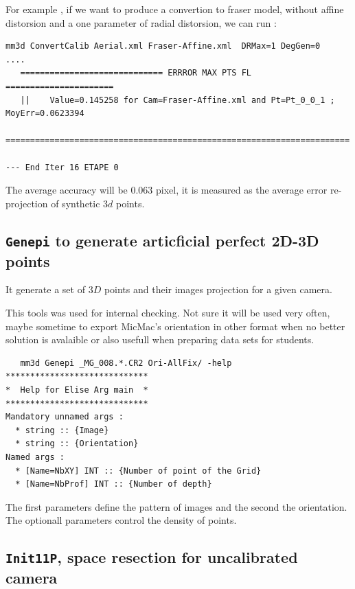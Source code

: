 For example , if we want to produce a convertion to fraser model, without affine distorsion and a one parameter of radial
distorsion, we can run :

\begin{verbatim}
mm3d ConvertCalib Aerial.xml Fraser-Affine.xml  DRMax=1 DegGen=0
....
   ============================= ERRROR MAX PTS FL ======================
   ||    Value=0.145258 for Cam=Fraser-Affine.xml and Pt=Pt_0_0_1 ; MoyErr=0.0623394
   ======================================================================

--- End Iter 16 ETAPE 0

\end{verbatim}


The average accuracy will be $0.063$ pixel, it is measured as the average error re-projection of  synthetic $3d$ points.



\subsection{{\tt Genepi} to generate articficial perfect 2D-3D points}

It generate a set of $3D$ points and their images projection for a given camera.

This tools was used for internal checking. Not sure it will be used very often, maybe sometime to export 
MicMac's orientation in other format when no better solution is avalaible or also usefull when preparing
data sets for students.

\begin{verbatim}
   mm3d Genepi _MG_008.*.CR2 Ori-AllFix/ -help
*****************************
*  Help for Elise Arg main  *
*****************************
Mandatory unnamed args : 
  * string :: {Image}
  * string :: {Orientation}
Named args : 
  * [Name=NbXY] INT :: {Number of point of the Grid}
  * [Name=NbProf] INT :: {Number of depth}

\end{verbatim}

The first parameters define the  pattern of images and the second the orientation. The optionall parameters control
the density of points.



\subsection{{\tt Init11P}, space resection for uncalibrated camera}

